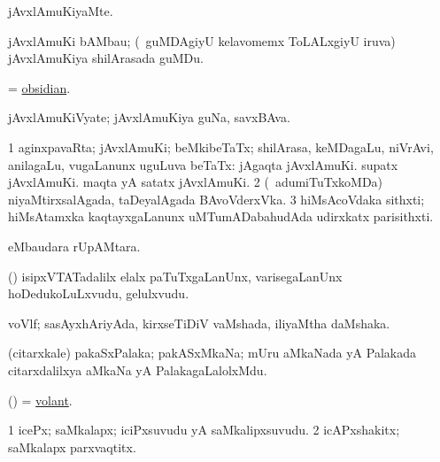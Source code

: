 \bentry 
{} 
\gl{\kirxvi}
\expl{}
\bmng
 jAvxlAmuKiyaMte. 
\emng
\eentry

\bentry 
{}
\gl{\nA}
\expl{}
\bmng
 jAvxlAmuKi bAMbau; (\sA\ guMDAgiyU kelavomemx ToLALxgiyU iruva) jAvxlAmuKiya shilArasada guMDu. 
\emng
\eentry

\bentry 
{} 
\gl{\nA}
\expl{}
\bmng
 = \hyperref{kandict_o.pdf}{O}{obsidian}{obsidian}. 
\emng
\eentry

\bentry
{} 
\gl{\nA}
\expl{}
\bmng
 jAvxlAmuKiVyate; jAvxlAmuKiya guNa, savxBAva. 
\emng
\eentry

\bentry 
{} 
\gl{\nA}
\bmng
\bnum
\num{1} aginxpavaRta; jAvxlAmuKi; beMkibeTaTx; shilArasa, keMDagaLu, niVrAvi, anilagaLu, \mo vugaLanunx uguLuva beTaTx:  jAgaqta jAvxlAmuKi.  supatx jAvxlAmuKi.  maqta yA satatx jAvxlAmuKi. 
\num{2} (\kanmu\ adumiTuTxkoMDa) niyaMtirxsalAgada, taDeyalAgada BAvoVderxVka. 
\num{3} hiMsAcoVdaka sithxti; hiMsAtamxka kaqtayxgaLanunx uMTumADabahudAda udirxkatx parisithxti. 
\enum
\emng
\eentry

\bentry
{} 
\gl{\nA}
\expl{}
\bmng
  eMbaudara rUpAMtara. 
\emng
\eentry

\bentry 
{} 
\gl{\nA}
\expl{}
\bmng
 (\pArxparx) isipxVTATadalilx elalx paTuTxgaLanUnx, varisegaLanUnx hoDedukoLuLxvudu, gelulxvudu. 
\emng
\eentry

\bentry 
{} 
\gl{\nA}
\expl{}
\bmng
 voVlf; sasAyxhAriyAda, kirxseTiDiV vaMshada, iliyaMtha daMshaka.  
\emng
\eentry

\bentry
{} 
\gl{\nA}
\expl{}
\bmng
 (citarxkale) pakaSxPalaka; pakASxMkaNa; mUru aMkaNada yA Palakada citarxdalilxya aMkaNa yA PalakagaLalolxMdu. 
\emng
\eentry

\bentry 
{} 
\gl{\gu}
\expl{}
\bmng
 (\pArxvi) = \hyperlink{volant}{volant}. 
\emng
\eentry

\bentry
{} 
\gl{\nA}
\expl{}
\bmng
\bnum
\num{1} icePx; saMkalapx; iciPxsuvudu yA saMkalipxsuvudu. 
\num{2} icAPxshakitx; saMkalapx parxvaqtitx. 
\enum
\emng

